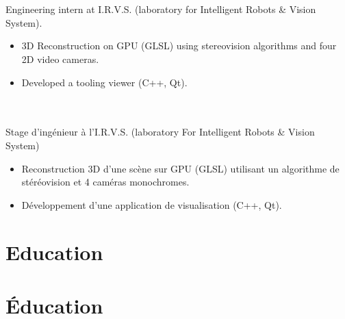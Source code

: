 \documentclass{resume}
\begin{document}
 {
   \\
   \\
  Engineering intern at I.R.V.S. (laboratory for Intelligent Robots \& Vision System). \\
  \begin{itemize}
  	\item 3D Reconstruction on GPU (GLSL) using stereovision algorithms and four 2D video cameras.
  	\item Developed a tooling viewer (C++, Qt).
  \end{itemize}
} {
   \\
   \\
  Stage d'ing\'{e}nieur \`{a} l'I.R.V.S. (laboratory For Intelligent Robots \& Vision System) \\
  \begin{itemize}
  	\item Reconstruction 3D d'une sc\`{e}ne sur GPU (GLSL) utilisant un algorithme
  		de st\'{e}r\'{e}ovision et 4 cam\'{e}ras monochromes.
  	\item D\'{e}veloppement d'une application de visualisation (C++, Qt).
  \end{itemize}
}

 {
  \section{{\faGraduationCap} Education}
} {
  \section{{\faGraduationCap} \'{E}ducation}
}

 \\
 {
   \\
} {
   \\
}
\end{document}

